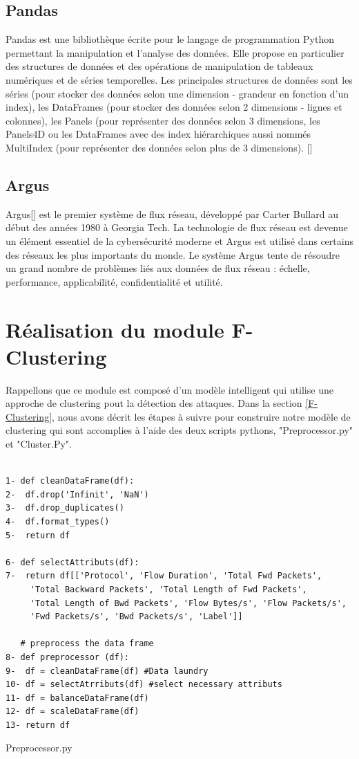 \subsection{Pandas}
Pandas est une bibliothèque écrite pour le langage de programmation Python permettant la manipulation et l'analyse des données. Elle propose en particulier des structures de données et des opérations de manipulation de tableaux numériques et de séries temporelles. Les principales structures de données sont les séries (pour stocker des données selon une dimension - grandeur en fonction d'un index), les DataFrames (pour stocker des données selon 2 dimensions - lignes et colonnes), les Panels (pour représenter des données selon 3 dimensions, les Panels4D ou les DataFrames avec des index hiérarchiques aussi nommés MultiIndex (pour représenter des données selon plus de 3 dimensions). [\cite{30}]

\subsection{Argus}
Argus[\cite{31}] est le premier système de flux réseau, développé par Carter Bullard au début des années 1980 à Georgia Tech. La technologie de flux réseau est devenue un élément essentiel de la cybersécurité moderne et Argus est utilisé dans certains des réseaux les plus importants du monde. Le système Argus tente de résoudre un grand nombre de problèmes liés aux données de flux réseau : échelle, performance, applicabilité, confidentialité et utilité.\\

\section{Réalisation du module F-Clustering}
Rappellons que ce module est composé d'un modèle intelligent qui utilise une approche de clustering pout la détection des attaques. Dans la section \ref{F-Clustering}, nous avons décrit les étapes à suivre pour construire notre modèle de clustering qui sont accomplies à l'aide des deux scripts pythons, "Preprocessor.py" et "Cluster.Py".
\begin{algorithm}[H]
\begin{verbatim}

1- def cleanDataFrame(df):
2-  df.drop('Infinit', 'NaN')
3-  df.drop_duplicates()
4-  df.format_types()
5-  return df

6- def selectAttributs(df):
7-  return df[['Protocol', 'Flow Duration', 'Total Fwd Packets',
     'Total Backward Packets', 'Total Length of Fwd Packets',	
     'Total Length of Bwd Packets', 'Flow Bytes/s', 'Flow Packets/s', 
     'Fwd Packets/s', 'Bwd Packets/s', 'Label']]
	
   # preprocess the data frame
8- def preprocessor (df): 
9-  df = cleanDataFrame(df) #Data laundry
10- df = selectAtrributs(df) #select necessary attributs 
11- df = balanceDataFrame(df) 
12- df = scaleDataFrame(df)
13- return df

\end{verbatim}
\caption{Preprocessor.py}
\end{algorithm}

